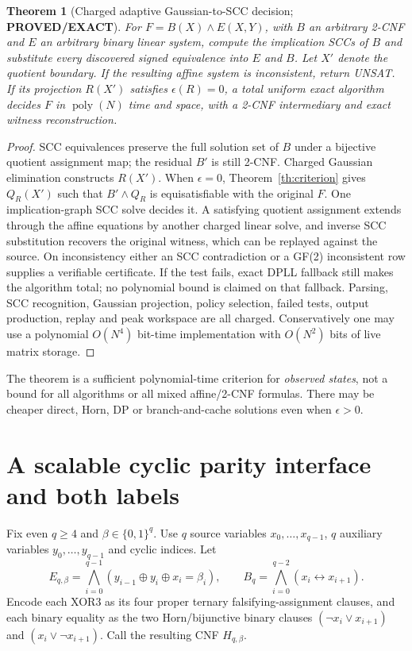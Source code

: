 \documentclass[11pt]{article}
\newtheorem{theorem}{Theorem}
\newcommand{\PROVED}{\textbf{PROVED/EXACT}}
\begin{document}
\begin{theorem}[Charged adaptive Gaussian-to-SCC decision; \PROVED]
For $F=B(X)\wedge E(X,Y)$, with $B$ an arbitrary 2-CNF and $E$ an
arbitrary binary linear system, compute the implication SCCs of $B$
and substitute every discovered signed equivalence into $E$ and $B$.
Let $X'$ denote the quotient boundary. If the resulting affine system
is inconsistent, return UNSAT. If its projection $R(X')$ satisfies
$\epsilon(R)=0$, a total uniform exact algorithm decides $F$ in
$\operatorname{poly}(N)$ time and space, with a 2-CNF intermediary
and exact witness reconstruction.
\end{theorem}
\begin{proof}
SCC equivalences preserve the full solution set of $B$ under a
bijective quotient assignment map; the residual $B'$ is still 2-CNF.
Charged Gaussian elimination constructs $R(X')$.
When $\epsilon=0$, Theorem~\ref{th:criterion} gives $Q_R(X')$
such that $B'\wedge Q_R$ is equisatisfiable with the original $F$.
One implication-graph SCC solve decides it. A satisfying quotient
assignment extends through the affine equations by another charged
linear solve, and inverse SCC substitution recovers the original
witness, which can be replayed against the source. On inconsistency
either an SCC contradiction or a GF(2) inconsistent row supplies a
verifiable certificate. If the test fails, exact DPLL fallback still
makes the algorithm total; no polynomial bound is claimed on that
fallback. Parsing, SCC recognition, Gaussian projection, policy
selection, failed tests, output production, replay and peak workspace
are all charged. Conservatively one may use a polynomial $O(N^4)$
bit-time implementation with $O(N^2)$ bits of live matrix storage.
\end{proof}
The theorem is a sufficient polynomial-time criterion for \emph{observed
states}, not a bound for all algorithms or all mixed affine/2-CNF formulas.
There may be cheaper direct, Horn, DP or branch-and-cache solutions
even when $\epsilon>0$.

\section{A scalable cyclic parity interface and both labels}
Fix even $q\ge4$ and $\beta\in\{0,1\}^q$.
Use $q$ source variables $x_0,\ldots,x_{q-1}$, $q$ auxiliary
variables $y_0,\ldots,y_{q-1}$ and cyclic indices. Let
\[
E_{q,\beta}=\bigwedge_{i=0}^{q-1}
(y_{i-1}\oplus y_i\oplus x_i=\beta_i),\qquad
B_q=\bigwedge_{i=0}^{q-2}(x_i\leftrightarrow x_{i+1}).
\tag{5}
\]
Encode each XOR3 as its four proper ternary falsifying-assignment clauses,
and each binary equality as the two Horn/bijunctive binary clauses
$(\neg x_i\vee x_{i+1})$ and $(x_i\vee\neg x_{i+1})$.
Call the resulting CNF $H_{q,\beta}$.
\end{document}
